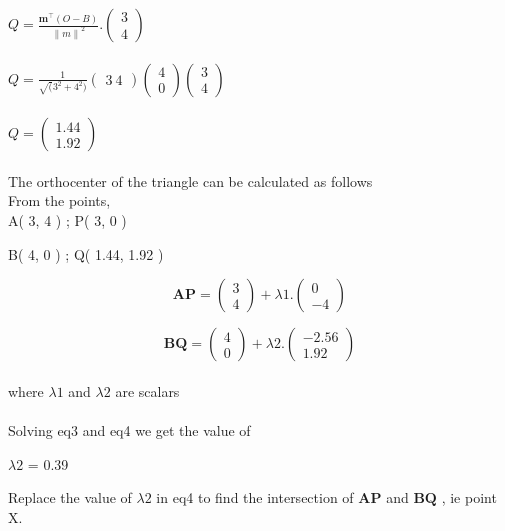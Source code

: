 \documentclass[journal,12pt,twocolumn]{IEEEtran}
\newcommand{\myvec}[1]{\ensuremath{\begin{pmatrix}#1\end{pmatrix}}}
\let\vec\mathbf
\begin{document}
$ Q = \frac{\vec{m^{\top}}(O-B)}{{\lVert m \rVert}^2}  . \myvec{
  3\\
  4} $ 
\\
\\

$ Q=\frac{1}{\surd(3^2 + 4^2)}\myvec{
  3\
  4}\myvec{
  4\\
  0}\myvec{
  3\\
  4} $ 
\\  
\\

$ Q=\myvec{
  1.44\\
  1.92} $ 
\\  
 \\
 
 The orthocenter of the triangle can be calculated as follows
 \\
 
 From the points,\\
 
 A( 3, 4 )     ;        P( 3, 0 )
 
 B( 4, 0 )     ;        Q( 1.44, 1.92 )
 
 
 
 \begin{equation}
 \vec{AP} = \myvec{3\\4}+\lambda1. \myvec{ 0\\-4}
 \end{equation}




\begin{equation}
\vec{BQ} = \myvec{4\\0}+\lambda2. \myvec{-2.56\\1.92}
\end{equation}
  \\
  
  where $\lambda1$ and $\lambda2$ are scalars
  \\  
 \vspace{4cm}
 \\
 Solving eq3 and eq4 we get the value of 
 \\
 \begin{center}
 $\lambda2$ = 0.39
 \end{center}
 \vspace{0.5cm}
 
  Replace the value of $\lambda2$ in eq4 to find the intersection of 
  $\vec{AP}$ and $\vec{BQ}$ , ie point X.
\vspace{1cm}
\\
\end{document}
